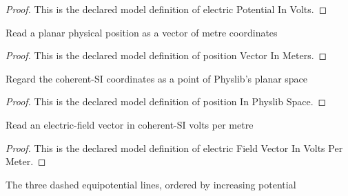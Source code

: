 \begin{proof}
  This is the declared model definition of electric Potential In Volts.
\end{proof}
\begin{definition}
  \label{def:physics:phyx-mini-0871:phyxminiproblems-problemphyxmini0871-positionvectorinmeters}
  Read a planar physical position as a vector of metre coordinates
\end{definition}
\begin{proof}
  This is the declared model definition of position Vector In Meters.
\end{proof}
\begin{definition}
  \label{def:physics:phyx-mini-0871:phyxminiproblems-problemphyxmini0871-positioninphyslibspace}
  Regard the coherent-SI coordinates as a point of Physlib's planar space
\end{definition}
\begin{proof}
  This is the declared model definition of position In Physlib Space.
\end{proof}
\begin{definition}
  \label{def:physics:phyx-mini-0871:phyxminiproblems-problemphyxmini0871-electricfieldvectorinvoltspermeter}
  Read an electric-field vector in coherent-SI volts per metre
\end{definition}
\begin{proof}
  This is the declared model definition of electric Field Vector In Volts Per Meter.
\end{proof}
\begin{definition}
  \label{def:physics:phyx-mini-0871:phyxminiproblems-problemphyxmini0871-potentialline}
  The three dashed equipotential lines, ordered by increasing potential
\end{definition}
